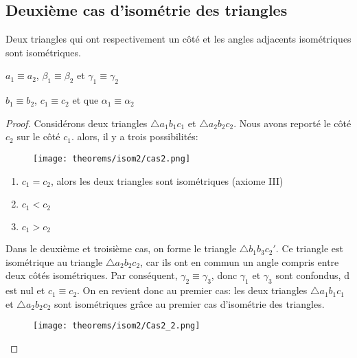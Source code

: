 \documentclass[a4paper,12pt]{article}
\begin{document}
\pagebreak
\subsection{Deuxième cas d'isométrie des triangles}
\begin{theorem}
Deux triangles qui ont respectivement un côté et les angles adjacents isométriques sont isométriques.
\end{theorem}
\begin{hyp}
$a_1 \equiv a_2$, $\beta_1 \equiv \beta_2$ et $\gamma_1 \equiv \gamma_2$
\end{hyp}
\begin{concl}
$b_1 \equiv b_2$, $c_1 \equiv c_2$ et que $\alpha_1 \equiv \alpha_2$
\end{concl}
\begin{proof}
Considérons deux triangles $\triangle a_1b_1c_1$ et $\triangle a_2b_2c_2$. Nous avons reporté le côté $c_2$ sur le côté $c_1$. alors, il y a trois possibilités:
\begin{figure}[H]
    \centering
    \texttt{[image: theorems/isom2/cas2.png]}
\end{figure}
\begin{enumerate}
\item $c_1 = c_2$, alors les deux triangles sont isométriques (axiome III)
\item $c_1<c_2$
\item $c_1>c_2$
\end{enumerate}

\pagebreak
Dans le deuxième et troisième cas, on forme le triangle $\triangle b_1b_3c_2'$. Ce triangle est isométrique au triangle $\triangle a_2b_2c_2$, car ils ont en commun un angle compris entre deux côtés isométriques. Par conséquent, $\gamma_2\equiv \gamma_3$, donc $\gamma_1$ et $\gamma_3$ sont confondus, d est nul et $c_1\equiv c_2$. On en revient donc au premier cas: les deux triangles $\triangle a_1b_1c_1$ et $\triangle a_2b_2c_2$ sont isométriques grâce au premier cas d'isométrie des triangles.


\begin{figure}[H]
    \centering
    \texttt{[image: theorems/isom2/Cas2\_2.png]}
\end{figure}



\end{proof}
\end{document}
